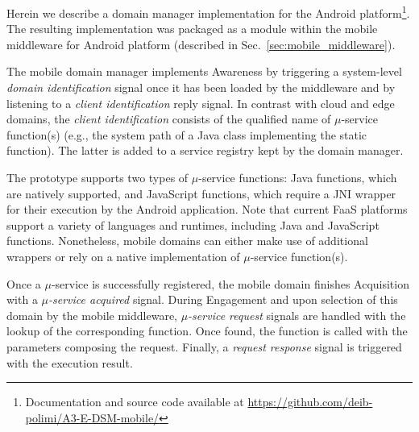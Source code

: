 Herein we describe a domain manager implementation for the Android platform\footnote{Documentation and source code available at \url{https://github.com/deib-polimi/A3-E-DSM-mobile/}}. 
The resulting implementation was packaged as a module within the mobile middleware for Android platform (described in Sec.~\ref{sec:mobile_middleware}). 

The mobile domain manager implements Awareness by triggering a system-level \textit{domain identification} signal once it has been loaded by the middleware and by listening to a \textit{client identification} reply signal. In contrast with cloud and edge domains, the \textit{client identification} consists of the qualified name of $\mu$-service function(s) (e.g., the system path of a Java class implementing the static function). The latter is added to a service registry kept by the domain manager.

The prototype supports two types of $\mu$-service functions: Java functions, which are natively supported, and JavaScript functions, which require a JNI wrapper for their execution by the Android application. Note that current FaaS platforms support a variety of languages and runtimes, including Java and JavaScript functions. Nonetheless, mobile domains can either make use of additional wrappers or rely on a native implementation of $\mu$-service function(s).  

Once a $\mu$-service is successfully registered, the mobile domain finishes Acquisition with a \textit{$\mu$-service acquired} signal. During Engagement and upon selection of this domain by the mobile middleware, \textit{$\mu$-service request} signals are handled with the lookup of the corresponding function. Once found, the function is called with the parameters composing the request. Finally, a \textit{request response} signal is triggered with the execution result.



